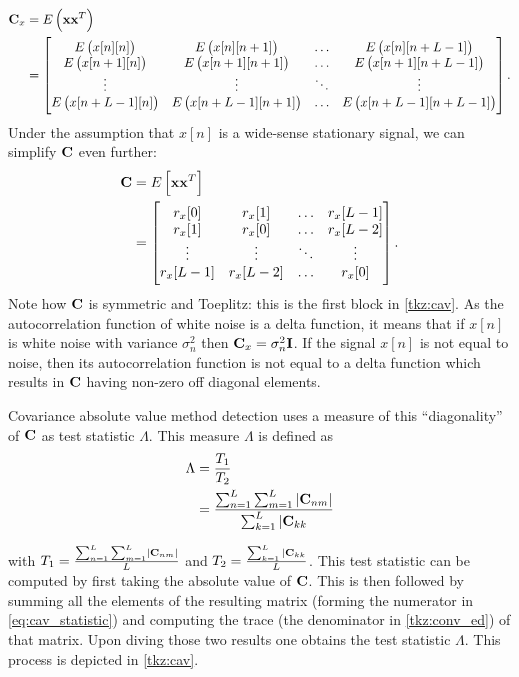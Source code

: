 \documentclass[a4paper, openany, oneside]{memoir}
\begin{document}
\begin{align*}
\boldsymbol{\mathbf{C}}_x &= E\left(\boldsymbol{\mathbf{x}}\boldsymbol{\mathbf{x}}^T\right) \\
&= \begin{bmatrix} 
E\left(x[n][n]\right) & E\left(x[n][n+1]\right) & \ldots & E\left(x[n][n+L-1]\right) \\
E\left(x[n+1][n]\right) & E\left(x[n+1][n+1]\right) & \ldots & E\left(x[n+1][n+L-1]\right) \\
\vdots & \vdots & \ddots & \vdots \\
E\left(x[n+L-1][n]\right) & E\left(x[n+L-1][n+1]\right) & \ldots & E\left(x[n+L-1][n+L-1]\right) \\
\end{bmatrix}.
\end{align*}
Under the assumption that $x[n]$ is a wide-sense stationary signal, we can simplify $\boldsymbol{\mathbf{C}}$ even further:
\begin{align*}
\boldsymbol{\mathbf{C}}&= E\left[\boldsymbol{\mathbf{x}}\boldsymbol{\mathbf{x}}^T\right] \\
&= \begin{bmatrix} 
r_x[0] & r_x[1] & \ldots & r_x[L-1] \\
r_x[1] & r_x[0] & \ldots & r_x[L-2] \\
\vdots & \vdots & \ddots & \vdots \\
r_x[L-1] & r_x[L-2] & \ldots & r_x[0] \\
\end{bmatrix}.
\end{align*}
Note how $\boldsymbol{\mathbf{C}}$ is symmetric and Toeplitz: this is the first block in \cref{tkz:cav}. As  the autocorrelation function of white noise is a delta function, it means that  if $x[n]$ is white noise with variance $\sigma_n^2$ then $\boldsymbol{\mathbf{C}}_x = \sigma_n^2\boldsymbol{\mathbf{I}}$.
If the signal $x[n]$ is not equal to noise, then its autocorrelation function is not equal to a delta function which results in $\boldsymbol{\mathbf{C}}$ having non-zero off diagonal elements.

Covariance absolute value method detection uses a measure of this ``diagonality'' of $\boldsymbol{\mathbf{C}}$ as test statistic $\Lambda$.
This measure $\Lambda$ is defined as
\begin{align}\label{eq:cav_statistic}
\Lambda &= \frac{T_1}{T_2} \nonumber \\
&=\frac{\sum_{n=1}^{L} \sum_{m=1}^L \left|\boldsymbol{\mathbf{C}}_{nm}\right|}{\sum_{k=1}^L |\boldsymbol{\mathbf{C}}_{kk}}
\end{align} 

with $T_1 = \frac{\sum_{n=1}^{L} \sum_{m=1}^L \left|\boldsymbol{\mathbf{C}}_{nm}\right|}{L}$ and
$T_2 = \frac{\sum_{k=1}^L |\boldsymbol{\mathbf{C}}_{kk}}{L}$.
This test statistic can be computed by first taking the absolute value of $\boldsymbol{\mathbf{C}}$. This is then followed by summing all the elements of the resulting matrix (forming the numerator in \cref{eq:cav_statistic}) and computing the trace (the denominator in \cref{tkz:conv_ed}) of that matrix. Upon diving those two results one obtains the test statistic $\Lambda$. This process is depicted in \cref{tkz:cav}.
\end{document}
